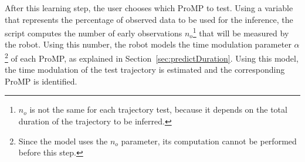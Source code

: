 \documentclass[utf8]{frontiersSCNS} %
\begin{document}




After this learning step, the user chooses which ProMP to test.
Using a variable that represents the percentage of observed data to be used for the inference, the script computes the number of early observations $n_o$\footnote{$n_o$ is not the same for each trajectory test, because it depends on the total duration of the trajectory to be inferred. } that will be measured by the robot. Using this number, the robot models the time modulation parameter $\alpha$\footnote{Since the model uses the $n_o$ parameter, its computation cannot be performed before this step.} of each ProMP, as explained in Section~\ref{sec:predictDuration}. 
Using this model, the time modulation of the test trajectory is estimated and the corresponding ProMP is identified.


\end{document}

